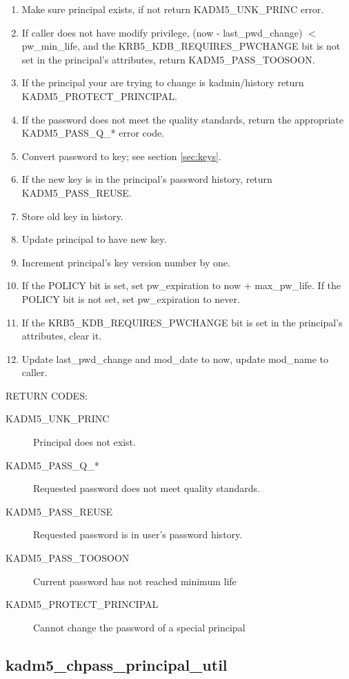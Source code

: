 \begin{enumerate}
\item Make sure principal exists, if not return KADM5_UNK_PRINC error.
\item If caller does not have modify privilege, (now - last_pwd_change) $<$
pw_min_life, and the KRB5_KDB_REQUIRES_PWCHANGE bit is not set in the
principal's attributes, return KADM5_PASS_TOOSOON.
\item If the principal your are trying to change is kadmin/history
return KADM5_PROTECT_PRINCIPAL.
\item If the password does not meet the quality
standards, return the appropriate KADM5_PASS_Q_* error code.
\item Convert password to key; see section \ref{sec:keys}.
\item If the new key is in the principal's password history, return
KADM5_PASS_REUSE.
\item Store old key in history.
\item Update principal to have new key.
\item Increment principal's key version number by one.
\item If the POLICY bit is set, set pw_expiration to now +
max_pw_life.  If the POLICY bit is not set, set pw_expiration to
never.
\item If the KRB5_KDB_REQUIRES_PWCHANGE bit is set in the principal's
attributes, clear it.
\item Update last_pwd_change and mod_date to now, update mod_name to
caller.
\end{enumerate}

RETURN CODES:

\begin{description}
\item[KADM5_UNK_PRINC] Principal does not exist.
\item[KADM5_PASS_Q_*] Requested password does not meet quality
standards. 
\item[KADM5_PASS_REUSE] Requested password is in user's
password history. 
\item[KADM5_PASS_TOOSOON] Current password has not reached minimum life
\item[KADM5_PROTECT_PRINCIPAL] Cannot change the password of a special principal
\end{description}


\subsection{kadm5_chpass_principal_util}


